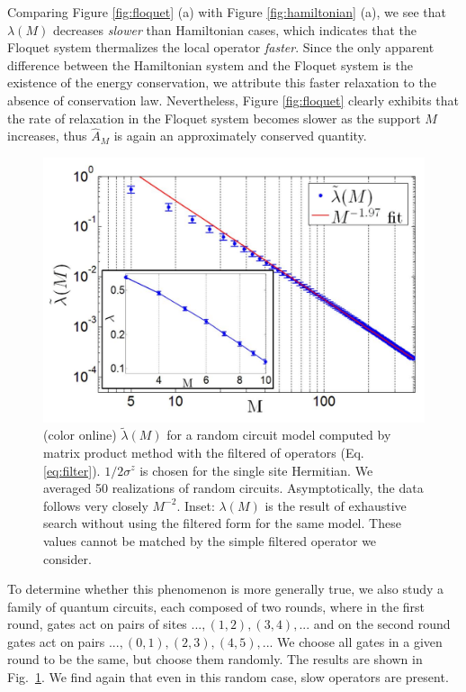 \documentclass[twocolumn,superscriptaddress, prl,showpacs]{revtex4-1}
\begin{document}
Comparing Figure \ref{fig:floquet} (a) with Figure \ref{fig:hamiltonian} (a),
we see that $\lambda(M)$ decreases {\it slower} than Hamiltonian cases, which indicates that the Floquet system thermalizes
the local operator {\it faster}. Since the only apparent difference between the Hamiltonian system and the Floquet system
is the existence of the energy conservation, we attribute this faster relaxation to the absence of conservation law.
Nevertheless, Figure \ref{fig:floquet} clearly exhibits that the rate of relaxation in the Floquet system
becomes slower as the support $M$ increases, thus $\hat{A}_M$ is again an approximately conserved quantity.


\begin{figure}
\includegraphics[width=1.0\linewidth]{fig_random_circuit.pdf}
\centering
\caption{ (color online)  $\tilde{\lambda}(M)$ for a random circuit model computed by matrix product method with the filtered of operators (Eq. \eqref{eq:filter}). $1/2\sigma^z$ is chosen for the single site Hermitian. We averaged 50 realizations of random circuits. Asymptotically, the data follows very closely $M^{-2}$.
Inset: $\lambda(M)$ is the result of exhaustive search without using the filtered form for the same model.
These values cannot be matched by the simple filtered operator we consider.}
\label{fig:random_circuit}
\end{figure}



To determine whether this phenomenon is more generally true, we also study a family of quantum circuits, each composed of two rounds, where in the first round, gates act on pairs of sites $...,(1,2),(3,4),...$ and on the second round gates act on pairs $...,(0,1),(2,3),(4,5),...$
We choose all gates in a given round to be the same, but choose them randomly.
The results are shown in Fig.~\ref{fig:random_circuit}.
We find again that even in this random case, slow operators are present.
\end{document}
